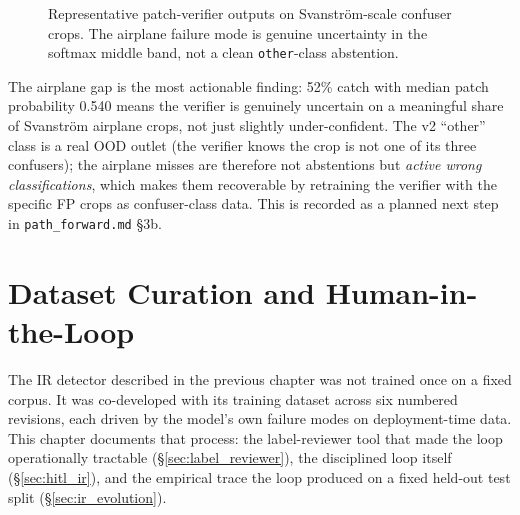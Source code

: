 \documentclass[12pt,a4paper,oneside,openright]{book}
\begin{document}
\begin{figure}[htbp]
    \centering
    \caption{Representative patch-verifier outputs on Svanstr\"om-scale confuser crops. The airplane failure mode is genuine uncertainty in the softmax middle band, not a clean \texttt{other}-class abstention.}
    \label{fig:patch_failure_modes}
\end{figure}

The airplane gap is the most actionable finding: 52\% catch with median patch probability 0.540 means the verifier is genuinely uncertain on a meaningful share of Svanstr\"om airplane crops, not just slightly under-confident. The v2 ``other'' class is a real OOD outlet (the verifier knows the crop is not one of its three confusers); the airplane misses are therefore not abstentions but \emph{active wrong classifications}, which makes them recoverable by retraining the verifier with the specific FP crops as confuser-class data. This is recorded as a planned next step in \texttt{path\_forward.md} \S3b.

\chapter{Dataset Curation and Human-in-the-Loop}
\label{ch:hitl}

The IR detector described in the previous chapter was not trained once on a fixed corpus. It was co-developed with its training dataset across six numbered revisions, each driven by the model's own failure modes on deployment-time data. This chapter documents that process: the label-reviewer tool that made the loop operationally tractable (\S\ref{sec:label_reviewer}), the disciplined loop itself (\S\ref{sec:hitl_ir}), and the empirical trace the loop produced on a fixed held-out test split (\S\ref{sec:ir_evolution}).
\end{document}
